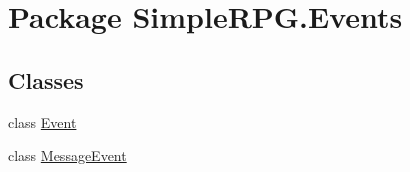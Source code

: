 \hypertarget{namespace_simple_r_p_g_1_1_events}{\section{Package Simple\+R\+P\+G.\+Events}
\label{namespace_simple_r_p_g_1_1_events}
}
\subsection*{Classes}
\begin{DoxyCompactItemize}
\item 
class \hyperlink{class_simple_r_p_g_1_1_events_1_1_event}{Event}
\item 
class \hyperlink{class_simple_r_p_g_1_1_events_1_1_message_event}{Message\+Event}
\end{DoxyCompactItemize}

